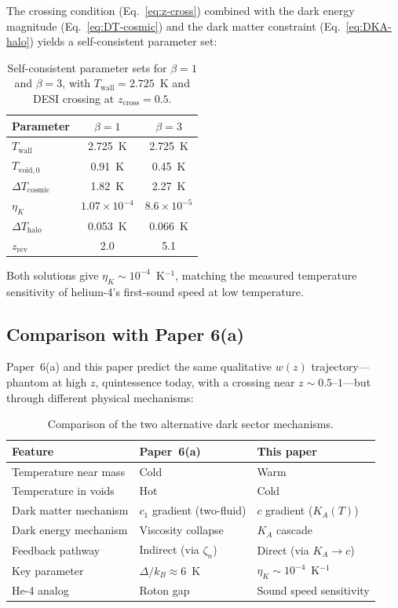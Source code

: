 \documentclass[12pt,letterpaper]{article}
\newcommand{\Ka}{K_{\!A}}
\newcommand{\etaK}{\eta_{\!K}}
\begin{document}
The crossing condition (Eq.~\ref{eq:z-cross}) combined with the dark energy
magnitude (Eq.~\ref{eq:DT-cosmic}) and the dark matter constraint
(Eq.~\ref{eq:DKA-halo}) yields a self-consistent parameter set:

\begin{table}[h]
\centering
\begin{tabular}{@{}lcc@{}}
\toprule
Parameter & $\beta = 1$ & $\beta = 3$ \\
\midrule
$T_{\mathrm{wall}}$        & 2.725~K & 2.725~K \\
$T_{\mathrm{void},0}$      & 0.91~K  & 0.45~K  \\
$\Delta T_{\mathrm{cosmic}}$ & 1.82~K & 2.27~K \\
$\etaK$                     & $1.07 \times 10^{-4}$ & $8.6 \times 10^{-5}$ \\
$\Delta T_{\mathrm{halo}}$  & 0.053~K & 0.066~K \\
$z_{\mathrm{rev}}$          & 2.0     & 5.1     \\
\bottomrule
\end{tabular}
\caption{Self-consistent parameter sets for $\beta = 1$ and $\beta = 3$,
  with $T_{\mathrm{wall}} = 2.725$~K and DESI crossing at
  $z_{\mathrm{cross}} = 0.5$.}
\label{tab:parameters}
\end{table}

Both solutions give $\etaK \sim 10^{-4}$~K$^{-1}$, matching the measured
temperature sensitivity of helium-4's first-sound speed at low temperature.


\subsection{Comparison with Paper 6(a)}

Paper~6(a) and this paper predict the same qualitative $w(z)$
trajectory---phantom at high $z$, quintessence today, with a crossing near
$z \sim 0.5$--$1$---but through different physical mechanisms:

\begin{table}[h]
\centering
\begin{tabular}{@{}lll@{}}
\toprule
Feature & Paper~6(a) & This paper \\
\midrule
Temperature near mass & Cold & Warm \\
Temperature in voids  & Hot  & Cold \\
Dark matter mechanism & $c_1$ gradient (two-fluid) & $c$ gradient ($\Ka(T)$) \\
Dark energy mechanism & Viscosity collapse & $\Ka$ cascade \\
Feedback pathway      & Indirect (via $\zeta_n$) & Direct (via $\Ka \to c$) \\
Key parameter         & $\Delta/k_B \approx 6$~K & $\etaK \sim 10^{-4}$~K$^{-1}$ \\
He-4 analog           & Roton gap & Sound speed sensitivity \\
\bottomrule
\end{tabular}
\caption{Comparison of the two alternative dark sector mechanisms.}
\label{tab:comparison}
\end{table}
\end{document}
